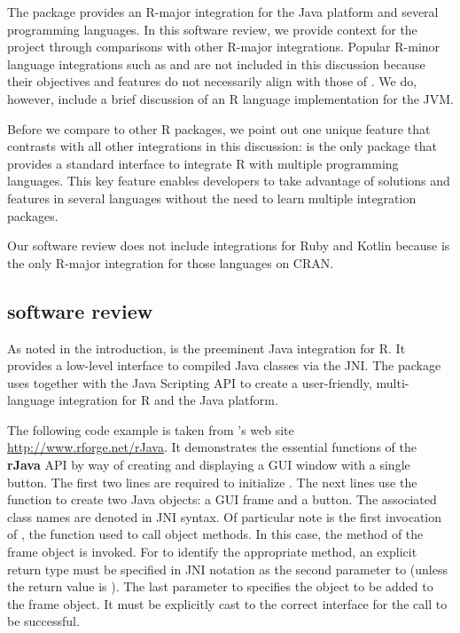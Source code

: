 The  package provides an R-major integration for the Java platform and several programming languages. In this software review, we provide context for the  project through comparisons with other R-major integrations. Popular R-minor language integrations such as  \citep{rserve} and  \citep{opencpu} are not included in this discussion because their objectives and features do not necessarily align with those of . We do, however, include a brief discussion of an R language implementation for the JVM.

Before we compare  to other R packages, we point out one unique feature that contrasts  with all other integrations in this discussion:  is the only package that provides a standard interface to integrate R with multiple programming languages. This key feature enables developers to take advantage of solutions and features in several languages without the need to learn multiple integration packages.

Our software review does not include integrations for Ruby and Kotlin because  is the only R-major integration for those languages on CRAN.

\hypertarget{rjava-software-review}{}
\subsection{ software review}

As noted in the introduction,  is the preeminent Java integration for R. It provides a low-level interface to compiled Java classes via the JNI. The  package uses  together with the Java Scripting API to create a user-friendly, multi-language integration for R and the Java platform.

The following code example is taken from 's web site \url{http://www.rforge.net/rJava}. It demonstrates the essential functions of the \textbf{rJava} API by way of creating and displaying a GUI window with a single button. The first two lines are required to initialize . The next lines use the  function to create two Java objects: a GUI frame and a button. The associated class names are denoted in JNI syntax. Of particular note is the first invocation of , the function used to call object methods. In this case, the  method of the frame object is invoked. For  to identify the appropriate method, an explicit return type must be specified in JNI notation as the second parameter to  (unless the return value is ). The last parameter to  specifies the object to be added to the frame object. It must be explicitly cast to the correct interface for the call to be successful.

